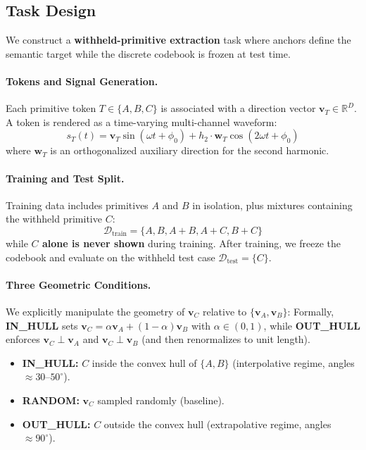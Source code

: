 \documentclass{article}
\begin{document}
\subsection{Task Design}
We construct a \textbf{withheld-primitive extraction} task where anchors define the semantic target while the discrete codebook is frozen at test time.

\paragraph{Tokens and Signal Generation.}
Each primitive token $T \in \{A, B, C\}$ is associated with a direction vector $\mathbf{v}_T \in \mathbb{R}^D$.
A token is rendered as a time-varying multi-channel waveform:
\begin{equation}
    s_T(t) = \mathbf{v}_T \sin(\omega t + \phi_0) + h_2 \cdot \mathbf{w}_T \cos(2\omega t + \phi_0)
\end{equation}
where $\mathbf{w}_T$ is an orthogonalized auxiliary direction for the second harmonic.

\paragraph{Training and Test Split.}
Training data includes primitives $A$ and $B$ in isolation, plus mixtures containing the withheld primitive $C$:
\begin{equation}
    \mathcal{D}_{\text{train}} = \{A, B, A{+}B, A{+}C, B{+}C\}
\end{equation}
while \textbf{$C$ alone is never shown} during training.
After training, we freeze the codebook and evaluate on the withheld test case $\mathcal{D}_{\text{test}} = \{C\}$.

\paragraph{Three Geometric Conditions.}
We explicitly manipulate the geometry of $\mathbf{v}_C$ relative to $\{\mathbf{v}_A, \mathbf{v}_B\}$:
Formally, \textbf{IN\_HULL} sets $\mathbf{v}_C=\alpha \mathbf{v}_A+(1-\alpha)\mathbf{v}_B$ with $\alpha\in(0,1)$, while \textbf{OUT\_HULL} enforces $\mathbf{v}_C \perp \mathbf{v}_A$ and $\mathbf{v}_C \perp \mathbf{v}_B$ (and then renormalizes to unit length).

\begin{itemize}
    \item \textbf{IN\_HULL:} $C$ inside the convex hull of $\{A, B\}$ (interpolative regime, angles $\approx 30$--$50^\circ$).
    \item \textbf{RANDOM:} $\mathbf{v}_C$ sampled randomly (baseline).
    \item \textbf{OUT\_HULL:} $C$ outside the convex hull (extrapolative regime, angles $\approx 90^\circ$).
\end{itemize}
\end{document}
